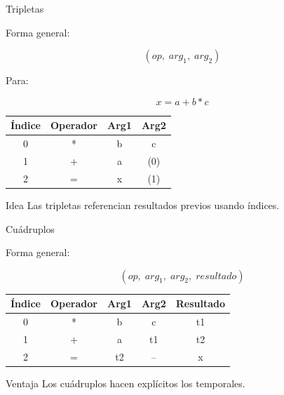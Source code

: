 \documentclass{beamer}
\begin{document}
\begin{frame}{Tripletas}

Forma general:

\[
(op,\; arg_1,\; arg_2)
\]

\vspace{0.3cm}

Para:

\[
x = a + b * c
\]

\centering

\begin{tabular}{|c|c|c|c|}
\hline
Índice & Operador & Arg1 & Arg2 \\
\hline
0 & * & b & c \\
\hline
1 & + & a & (0) \\
\hline
2 & = & x & (1) \\
\hline
\end{tabular}

\vspace{0.4cm}

\begin{block}{Idea}
Las tripletas referencian resultados previos usando índices.
\end{block}

\end{frame}

\begin{frame}{Cuádruplos}

Forma general:

\[
(op,\; arg_1,\; arg_2,\; resultado)
\]

\vspace{0.3cm}

\centering

\begin{tabular}{|c|c|c|c|c|}
\hline
Índice & Operador & Arg1 & Arg2 & Resultado \\
\hline
0 & * & b & c & t1 \\
\hline
1 & + & a & t1 & t2 \\
\hline
2 & = & t2 & -- & x \\
\hline
\end{tabular}

\vspace{0.4cm}

\begin{block}{Ventaja}
Los cuádruplos hacen explícitos los temporales.
\end{block}

\end{frame}
\end{document}
